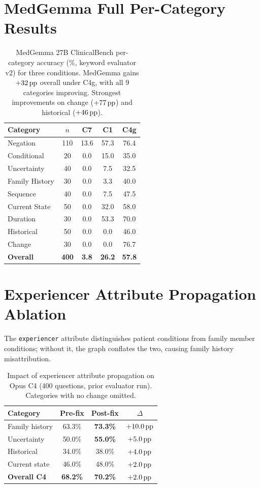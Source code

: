 \section{MedGemma Full Per-Category Results}
\label{app:medgemma_percategory}

\begin{table}[ht]
\centering
\small
\begin{tabular}{@{}lcccc@{}}
\toprule
\textbf{Category} & $n$ & \textbf{C7} & \textbf{C1} & \textbf{C4g} \\
\midrule
Negation & 110 & 13.6 & 57.3 & 76.4 \\
Conditional & 20 & 0.0 & 15.0 & 35.0 \\
Uncertainty & 40 & 0.0 & 7.5 & 32.5 \\
Family History & 30 & 0.0 & 3.3 & 40.0 \\
Sequence & 40 & 0.0 & 7.5 & 47.5 \\
Current State & 50 & 0.0 & 32.0 & 58.0 \\
Duration & 30 & 0.0 & 53.3 & 70.0 \\
Historical & 50 & 0.0 & 0.0 & 46.0 \\
Change & 30 & 0.0 & 0.0 & 76.7 \\
\midrule
\textbf{Overall} & \textbf{400} & \textbf{3.8} & \textbf{26.2} & \textbf{57.8} \\
\bottomrule
\end{tabular}
\caption{MedGemma 27B ClinicalBench per-category accuracy (\%, keyword evaluator v2) for three conditions. MedGemma gains $+32\,\text{pp}$ overall under C4g, with all 9 categories improving. Strongest improvements on change ($+77\,\text{pp}$) and historical ($+46\,\text{pp}$).}
\label{tab:medgemma_percategory}
\end{table}


\section{Experiencer Attribute Propagation Ablation}
\label{app:experiencer}

The \texttt{experiencer} attribute distinguishes patient conditions from family member conditions; without it, the graph conflates the two, causing family history misattribution.

\begin{table}[ht]
\centering
\caption{Impact of experiencer attribute propagation on Opus C4 (400 questions, prior evaluator run). Categories with no change omitted.}
\label{tab:experiencer_fix}
\small
\begin{tabular}{@{}lccc@{}}
\toprule
Category & Pre-fix & Post-fix & $\Delta$ \\
\midrule
Family history & 63.3\% & \textbf{73.3\%} & $+10.0\,\text{pp}$ \\
Uncertainty & 50.0\% & \textbf{55.0\%} & $+5.0\,\text{pp}$ \\
Historical & 34.0\% & 38.0\% & $+4.0\,\text{pp}$ \\
Current state & 46.0\% & 48.0\% & $+2.0\,\text{pp}$ \\
\midrule
\textbf{Overall C4} & \textbf{68.2\%} & \textbf{70.2\%} & $+2.0\,\text{pp}$ \\
\bottomrule
\end{tabular}
\end{table}

